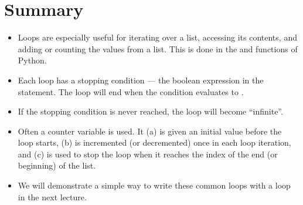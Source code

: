 \documentclass[letterpaper,10pt,english]{sphinxmanual}
\begin{document}
\section{Summary}
\label{\detokenize{lecture_notes/lec09_loops1_while:summary}}\begin{itemize}
\item {} 
Loops are especially useful for iterating over a list, accessing its
contents, and adding or counting the values from a list.  This is
done in the  and  functions of Python.

\item {} 
Each loop has a stopping condition — the boolean expression in
the  statement.  The loop will end when the condition
evaluates to .

\item {} 
If the stopping condition is never reached, the loop will become
“infinite”.

\item {} 
Often a counter variable is used.  It (a) is given an initial value
before the loop starts, (b) is incremented (or decremented) once in
each loop iteration, and (c) is used to stop the loop when it
reaches the index of the end (or beginning) of the list.

\item {} 
We will demonstrate a simple way to write these common loops with a
 loop in the next lecture.

\end{itemize}
\end{document}
